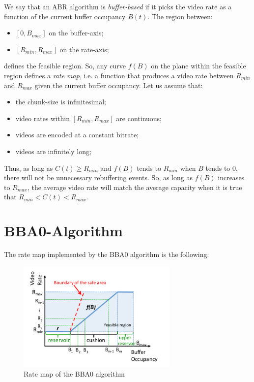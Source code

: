 \documentclass[a4paper]{report}
\begin{document}
We say that an ABR algorithm is \textit{buffer-based} if it picks the video rate as a function of the current buffer occupancy $B(t)$.
The region between:
\begin{itemize}
\item $[0, B_{max}]$ on the buffer-axis;
\item $[R_{min}, R_{max}]$ on the rate-axis;
\end{itemize}
defines the feasible region. So, any curve $f(B)$ on the plane within the feasible region defines a \textit{rate map}, i.e. a function that produces a video rate between $R_{min}$ and $R_{max}$ given the current buffer occupancy.
Let us assume that:
\begin{itemize}
\item the chunk-size is infinitesimal;
\item video rates within $[R_{min}, R_{max}]$ are continuous;
\item videos are encoded at a constant bitrate;
\item videos are infinitely long;
\end{itemize}
Thus, as long as $C(t) \geq R_{min}$ and $f(B)$ tends to $R_{min}$ when $B$ tends to $0$, there will not be unnecessary rebuffering events. So, as long as $f(B)$ increases to $R_{max}$, the average video rate will match the average capacity when it is true that $R_{min}<C(t)<R_{max}$.

\section{BBA0-Algorithm}
The rate map implemented by the BBA0 algorithm is the following:

\begin{figure}[H]
  \begin{center}
    \includegraphics[width=0.7\textwidth]{ratemapBBA0}
  \end{center}
  \caption{Rate map of the BBA0 algorithm ~\citep{Huang:2014:BAR:2740070.2626296} }\label{ratemapBBA0}
\end{figure}
\end{document}
